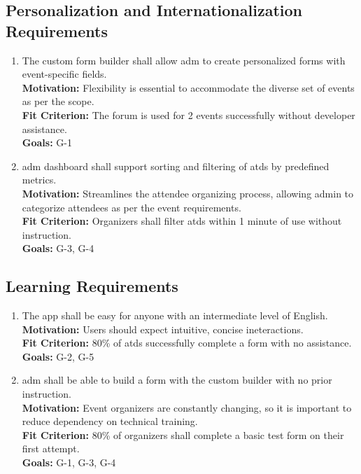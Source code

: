 \documentclass[12pt]{article}
\begin{document}
\subsection{Personalization and Internationalization Requirements}
\begin{enumerate}[label=PI-\arabic*, wide=0pt, leftmargin=*]
  \item \label{PI1}The custom form builder shall allow \gls{adm} to create personalized forms with event-specific fields.\\[2mm]
    {\bf Motivation:} Flexibility is essential to accommodate the diverse set of events as per the scope.\\
    {\bf Fit Criterion:} The forum is used for 2 events successfully without developer assistance.\\
    {\bf Goals:} G-1
  \item \label{PI2} \Gls{adm} dashboard shall support sorting and filtering of \glspl{atd} by predefined metrics.\\[2mm]
    {\bf Motivation:} Streamlines the attendee organizing process, allowing admin to categorize attendees as per the event requirements.\\
    {\bf Fit Criterion:} Organizers shall filter \glspl{atd} within 1 minute of use without instruction.\\
    {\bf Goals:} G-3, G-4
\end{enumerate}

\subsection{Learning Requirements}
\begin{enumerate}[label=\bfseries LR-\arabic*:, wide=0pt, leftmargin=*,ref=\bfseries LR-\arabic*]
  \item \label{LR1} The app shall be easy for anyone with an intermediate level of English.\\[2mm]
    {\bf Motivation:} Users should expect intuitive, concise ineteractions.\\
    {\bf Fit Criterion:} 80\% of \glspl{atd} successfully complete a form with no assistance.\\
    {\bf Goals:} G-2, G-5
  \item \label{LR2} \Gls{adm} shall be able to build a form with the custom builder with no prior instruction.\\[2mm]
    {\bf Motivation:} Event organizers are constantly changing, so it is important to reduce dependency on technical training.\\
    {\bf Fit Criterion:} 80\% of organizers shall complete a basic test form on their first attempt.\\
    {\bf Goals:} G-1, G-3, G-4
\end{enumerate}
\end{document}
